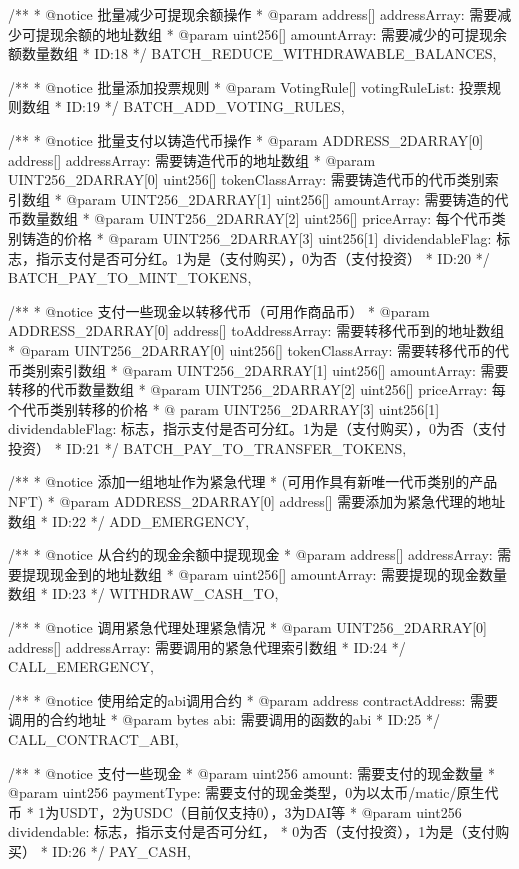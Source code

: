 \documentclass[main.tex]{subfiles}
\begin{document}
\begin{spverbatim}
  /**
   * @notice 批量减少可提现余额操作
   * @param address[] addressArray: 需要减少可提现余额的地址数组
   * @param uint256[] amountArray: 需要减少的可提现余额数量数组
   * ID:18
   */
  BATCH_REDUCE_WITHDRAWABLE_BALANCES,

  /**
   * @notice 批量添加投票规则
   * @param VotingRule[] votingRuleList: 投票规则数组
   * ID:19
   */
  BATCH_ADD_VOTING_RULES,


  /**
   * @notice 批量支付以铸造代币操作
   * @param ADDRESS_2DARRAY[0] address[] addressArray: 需要铸造代币的地址数组
   * @param UINT256_2DARRAY[0] uint256[] tokenClassArray: 需要铸造代币的代币类别索引数组
   * @param UINT256_2DARRAY[1] uint256[] amountArray: 需要铸造的代币数量数组
   * @param UINT256_2DARRAY[2] uint256[] priceArray: 每个代币类别铸造的价格
   * @param UINT256_2DARRAY[3] uint256[1] dividendableFlag: 标志，指示支付是否可分红。1为是（支付购买），0为否（支付投资）
   * ID:20
   */
  BATCH_PAY_TO_MINT_TOKENS,

  /**
   * @notice 支付一些现金以转移代币（可用作商品币）
   * @param ADDRESS_2DARRAY[0] address[] toAddressArray: 需要转移代币到的地址数组
   * @param UINT256_2DARRAY[0] uint256[] tokenClassArray: 需要转移代币的代币类别索引数组
   * @param UINT256_2DARRAY[1] uint256[] amountArray: 需要转移的代币数量数组
   * @param UINT256_2DARRAY[2] uint256[] priceArray: 每个代币类别转移的价格
   * @ param UINT256_2DARRAY[3] uint256[1] dividendableFlag: 标志，指示支付是否可分红。1为是（支付购买），0为否（支付投资）
   * ID:21
   */
  BATCH_PAY_TO_TRANSFER_TOKENS,

  /**
   * @notice 添加一组地址作为紧急代理
   *  (可用作具有新唯一代币类别的产品NFT)
   * @param ADDRESS_2DARRAY[0] address[] 需要添加为紧急代理的地址数组 
   * ID:22
   */
  ADD_EMERGENCY,

  /**
   * @notice 从合约的现金余额中提现现金
   * @param address[] addressArray: 需要提现现金到的地址数组
   * @param uint256[] amountArray: 需要提现的现金数量数组
   * ID:23
   */
  WITHDRAW_CASH_TO,

  /**
   * @notice 调用紧急代理处理紧急情况
   * @param UINT256_2DARRAY[0] address[] addressArray: 需要调用的紧急代理索引数组
   * ID:24
   */
  CALL_EMERGENCY,


  /**
   * @notice 使用给定的abi调用合约
   * @param address contractAddress: 需要调用的合约地址
   * @param bytes abi: 需要调用的函数的abi
   * ID:25
   */
  CALL_CONTRACT_ABI,

  /**
   * @notice 支付一些现金
   * @param uint256 amount: 需要支付的现金数量
   * @param uint256 paymentType: 需要支付的现金类型，0为以太币/matic/原生代币
   *  1为USDT，2为USDC（目前仅支持0），3为DAI等
   * @param uint256 dividendable: 标志，指示支付是否可分红，
   * 0为否（支付投资），1为是（支付购买）
   * ID:26
   */
  PAY_CASH,


\end{spverbatim}
\end{document}
